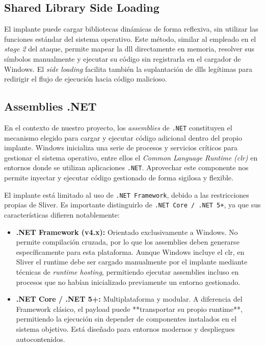 \subsection{Shared Library Side Loading}
El implante puede cargar bibliotecas dinámicas de forma reflexiva, sin utilizar las funciones estándar del sistema operativo.  
Este método, similar al empleado en el \textit{stage 2} del ataque, permite mapear la \acrshort{dll} directamente en memoria, resolver sus símbolos manualmente y ejecutar su código sin registrarla en el cargador de Windows.  
El \textit{side loading} facilita también la suplantación de \acrshort{dll}s legítimas para redirigir el flujo de ejecución hacia código malicioso.

\subsection{Assemblies .NET}

En el contexto de nuestro proyecto, los \textit{assemblies} de \texttt{.NET} constituyen el mecanismo elegido para cargar y ejecutar código adicional dentro del propio implante. Windows inicializa una serie de procesos y servicios críticos para gestionar el sistema operativo, entre ellos el \textit{Common Language Runtime (\acrshort{clr})} en entornos donde se utilizan aplicaciones \texttt{.NET}. Aprovechar este componente nos permite inyectar y ejecutar código gestionado de forma sigilosa y flexible.

El implante está limitado al uso de \texttt{.NET Framework}, debido a las restricciones propias de Sliver. Es importante distinguirlo de \texttt{.NET Core / .NET 5+}, ya que sus características difieren notablemente:

\begin{itemize}
    \item \textbf{.NET Framework (v4.x):} Orientado exclusivamente a Windows. No permite compilación cruzada, por lo que los assemblies deben generarse específicamente para esta plataforma. Aunque Windows incluye el \acrshort{clr}, en Sliver el runtime debe ser cargado manualmente por el implante mediante técnicas de \textit{runtime hosting}, permitiendo ejecutar assemblies incluso en procesos que no habían inicializado previamente un entorno gestionado.
    \item \textbf{.NET Core / .NET 5+:} Multiplataforma y modular. A diferencia del Framework clásico, el payload puede **transportar su propio runtime**, permitiendo la ejecución sin depender de componentes instalados en el sistema objetivo. Está diseñado para entornos modernos y despliegues autocontenidos.
\end{itemize}

